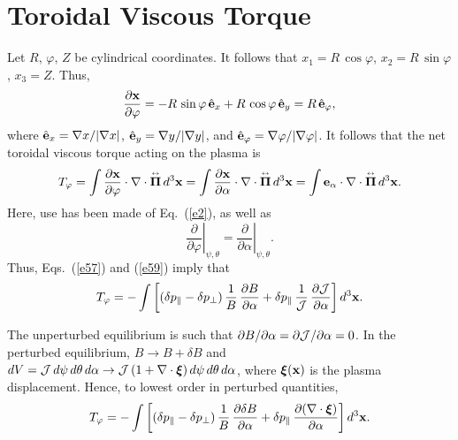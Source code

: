 \documentclass[12pt,prb,aps,notitlepage]{revtex4-1}
\newcommand{\bxi}{\mbox{\boldmath$\xi$}}
\newcommand{\bPi}{\mbox{\boldmath$\Pi$}}
\newcommand{\smalltensor}[1]{\overset{\text{\tiny$\leftrightarrow$}}{#1}}
\begin{document}
\section{Toroidal Viscous Torque}
 Let $R$, $\varphi$, $Z$ be cylindrical coordinates. It follows that $x_1=R\,\cos\varphi$, $x_2=R\,\sin\varphi$, $x_3=Z$. Thus,
 \begin{equation}
 \frac{\partial {\bf x}}{\partial\varphi} = -R\,\sin\varphi\,\hat{\bf e}_x+R\,\cos\varphi\,\hat{\bf e}_y= R\,\hat{\bf e}_\varphi,
 \end{equation}
 where $\hat{\bf e}_x=\nabla x/|\nabla x|$, $\hat{\bf e}_y=\nabla y/|\nabla y|$, and $\hat{\bf e}_\varphi=\nabla \varphi/|\nabla \varphi|$. 
 It follows that the net toroidal viscous torque acting on the plasma is
 \begin{equation}\label{e59}
 T_\varphi = \int  \frac{\partial {\bf x}}{\partial\varphi} \cdot\nabla\cdot \smalltensor{\bPi}\,d^3{\bf x}= \int  \frac{\partial {\bf x}}{\partial\alpha} \cdot\nabla\cdot \smalltensor{\bPi}\,d^3{\bf x} = \int  {\bf e}_\alpha \cdot\nabla\cdot \smalltensor{\bPi}\,d^3{\bf x}.
 \end{equation}
 Here, use has been made of Eq.~(\ref{e2}), as well as 
 \begin{equation}
 \left.\frac{\partial}{\partial\varphi}\right|_{\psi,\theta} = \left.\frac{\partial}{\partial\alpha}\right|_{\psi,\theta}.
 \end{equation}
 Thus, Eqs.~(\ref{e57}) and (\ref{e59}) imply that
 \begin{equation}
 T_\varphi = -\int \left[(\delta p_\parallel-\delta p_\perp)\,\frac{1}{B}\,\frac{\partial B}{\partial \alpha}+\delta p_\parallel\,\frac{1}{{\cal J}}\,\frac{\partial{\cal J}}{\partial \alpha}\right]d^3{\bf x}.
 \end{equation}
 
 The unperturbed equilibrium is such that $\partial B/\partial \alpha =\partial{\cal J}/\partial\alpha=0$. In the perturbed equilibrium, 
 $B\rightarrow B+\delta B$ and 
 $dV= {\cal J}\,d\psi\,d\theta\,d\alpha\rightarrow {\cal J}\,(1+\nabla\cdot\bxi)\,d\psi\,d\theta\,d\alpha$, where $\bxi({\bf x})$ is the plasma displacement. Hence,
 to lowest order in perturbed quantities, 
 \begin{equation}\label{e62}
 T_\varphi = -\int \left[(\delta p_\parallel-\delta p_\perp)\,\frac{1}{B}\,\frac{\partial \delta B}{\partial \alpha}+\delta p_\parallel\,\frac{\partial(\nabla\cdot\bxi)}{\partial \alpha}\right]d^3{\bf x}.
 \end{equation}
 
\end{document}
